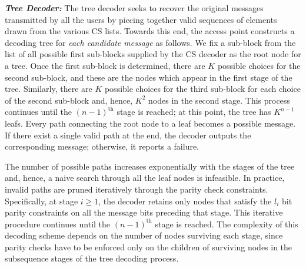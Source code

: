\documentclass{article}
\begin{document}
\begin{comment}
\subsubsection{De-interleaver}
\label{deinter}
\end{comment}
\textbf{\textit{Tree Decoder:}} The tree decoder seeks to recover the original messages transmitted by all the users by piecing together valid sequences of elements drawn from the various CS lists.
Towards this end, the access point constructs a decoding tree for \textit{each candidate message} as follows.
We fix a sub-block from the list of all possible first sub-blocks supplied by the CS decoder as the root node for a tree.
Once the first sub-block is determined, there are $K$ possible choices for the second sub-block, and these are the nodes which appear in the first stage of the tree.
Similarly, there are $K$ possible choices for the third sub-block for each choice of the second sub-block and, hence, $K^2$ nodes in the second stage.
This process continues until the $(n-1)^{\text{th}}$ stage is reached; at this point, the tree has $K^{n-1}$ leafs.
Every path connecting the root node to a leaf becomes a possible message.
If there exist a single valid path at the end, the decoder outputs the corresponding message; otherwise, it reports a failure.

The number of possible paths increases exponentially with the stages of the tree and, hence, a naive search through all the leaf nodes is infeasible.
In practice, invalid paths are pruned iteratively through the parity check constraints.
Specifically, at stage $i \ge 1$, the decoder retains only nodes that satisfy the $l_i$ bit parity constraints on all the message bits preceding that stage.
This iterative procedure continues until the $(n-1)^{\text{th}}$ stage is reached.
The complexity of this decoding scheme depends on the number of nodes surviving each stage, since parity checks have to be enforced only on the children of surviving nodes in the subsequence stages of the tree decoding process.
\end{document}

